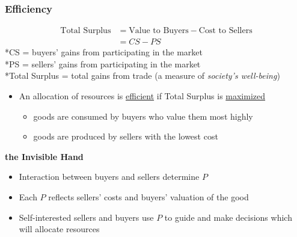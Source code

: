 \documentclass{article}
\begin{document}
\begin{multicols}{2}
\subsubsection{Efficiency}
\begin{equation*}
	\begin{aligned}
		\text{Total Surplus} &= \text{Value to Buyers} - \text{Cost to Sellers}\\
		&= CS - PS
	\end{aligned}
\end{equation*}
*CS = buyers' gains from participating in the market\\
*PS = sellers' gains from participating in the market\\
*Total Surplus = total gains from trade (a measure of \textit{society's well-being})\\

\begin{itemize}
	\item An allocation of resources is \underline{efficient} if Total Surplus is \underline{maximized}
	\begin{itemize}
		\item goods are consumed by buyers who value them most highly
		\item goods are produced by sellers with the lowest cost\\
	\end{itemize}
\end{itemize}

\vspace{1em}

\textbf{the Invisible Hand}
\begin{itemize}
	\item Interaction between buyers and sellers determine $P$
	\item Each $P$ reflects sellers' costs and buyers' valuation of the good
	\item Self-interested sellers and buyers use $P$ to guide and make decisions which will allocate resources\\
\end{itemize}


\end{multicols}
\end{document}
